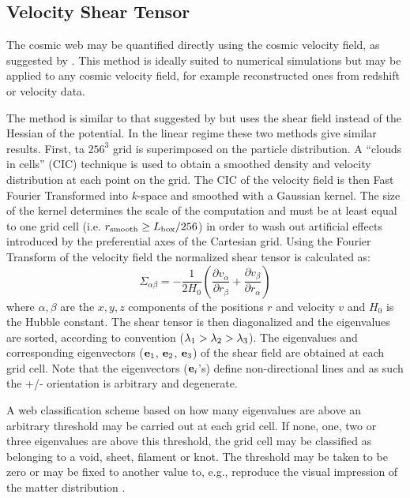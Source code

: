 \subsection{Velocity Shear Tensor}
\label{section:libeskind}
The cosmic web may be quantified directly using the cosmic velocity field, as suggested by \cite{2012MNRAS.425.2049H}. This method is ideally suited to numerical simulations but may be applied to any cosmic velocity field, for example reconstructed ones from redshift or velocity data.

The method is similar to that suggested by \citep{2007MNRAS.375..489H} but uses the shear field instead of the Hessian of the potential. In the linear regime these two methods give similar results. First, ta $256^{3}$ grid is superimposed on the particle distribution. A ``clouds in cells'' (CIC) technique is used to obtain a smoothed density and velocity distribution at each point on the grid. The CIC of the velocity field is then Fast Fourier Transformed into $k$-space and smoothed with a Gaussian kernel. The size of the kernel determines the scale of the computation and must be at least equal to one grid cell (i.e. $r_{\rm smooth}\ge L_{\rm box}/256$) in order to wash out artificial effects introduced by the preferential axes of the Cartesian grid. Using the Fourier Transform of the velocity field the normalized shear tensor is calculated as:
\begin{equation}
\Sigma_{\alpha\beta} = -\frac{1}{2H_{0}}\left(\frac{\partial v_{\alpha}}{\partial r_{\beta}}+\frac{\partial v_{\beta}}{\partial r_{\alpha}}\right)
\end{equation}
where $\alpha, \beta$ are the $x,y,z$ components of the positions $r$ and velocity $v$ and $H_{0}$ is the Hubble constant. The shear tensor is then diagonalized and the eigenvalues are sorted, according to convention ($\lambda_{\rm1}>\lambda_{\rm2}>\lambda_{\rm3}$). The eigenvalues  and corresponding eigenvectors (${\bf e}_{\rm 1}$, ${\bf e}_{\rm 2}$, ${\bf e}_{\rm 3}$) of the shear field are obtained at each grid cell. Note that the eigenvectors (${\bf e}_{i}$'s) define non-directional lines and as such the +/- orientation is arbitrary and degenerate.

A web classification scheme based on how many eigenvalues are above an arbitrary threshold may be carried out at each grid cell. If none, one, two or three eigenvalues are above this threshold, the grid cell may be classified as belonging to a void, sheet, filament or knot. The threshold may be taken to be zero \citep[as in][]{2007MNRAS.375..489H} or may be fixed to another value to, e.g., reproduce the visual impression of the matter distribution \citep{2009MNRAS.396.1815F}.


